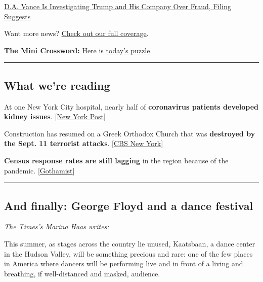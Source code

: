 \href{https://www.nytimes.com/2020/08/03/nyregion/donald-trump-taxes-cyrus-vance.html}{D.A.
Vance Is Investigating Trump and His Company Over Fraud, Filing
Suggests}

Want more news? \href{https://www.nytimes.com/section/nyregion}{Check
out our full coverage}.

\textbf{The Mini Crossword:} Here is
\href{https://www.nytimes.com/crosswords/game/mini}{today's puzzle}.

\begin{center}\rule{0.5\linewidth}{\linethickness}\end{center}

\hypertarget{what-were-reading}{%
\subsection{What we're reading}\label{what-were-reading}}

At one New York City hospital, nearly half of \textbf{coronavirus
patients developed kidney issues}.
{[}\href{https://nypost.com/2020/08/03/half-of-coronavirus-patients-at-nyc-hospital-developed-kidney-issues/}{New
York Post}{]}

Construction has resumed on a Greek Orthodox Church that was
\textbf{destroyed by the Sept. 11 terrorist attacks}.
{[}\href{https://newyork.cbslocal.com/2020/08/03/construction-resumes-to-rebuild-historic-greek-orthodox-church-destroyed-on-9-11/}{CBS
New York}{]}

\textbf{Census response rates are still lagging} in the region because
of the pandemic.
{[}\href{https://gothamist.com/news/nyc-census-response-rate-continues-lag-city-grapples-pandemic-fears-and-reduced-door-knocking}{Gothamist}{]}

\begin{center}\rule{0.5\linewidth}{\linethickness}\end{center}

\hypertarget{and-finally-george-floyd-and-a-dance-festival}{%
\subsection{And finally: George Floyd and a dance
festival}\label{and-finally-george-floyd-and-a-dance-festival}}

\emph{The Times's Marina Haas writes:}

This summer, as stages across the country lie unused, Kaatsbaan, a dance
center in the Hudson Valley, will be something precious and rare: one of
the few places in America where dancers will be performing live and in
front of a living and breathing, if well-distanced and masked, audience.

